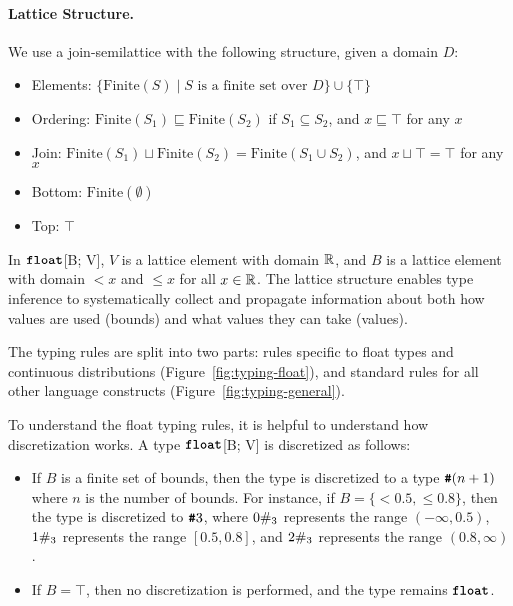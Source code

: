 \paragraph{Lattice Structure.} 
We use a join-semilattice with the following structure, given a domain $D$:
\begin{itemize}
    \item Elements: $\{\text{Finite}(S) \mid S \text{ is a finite set over } D\} \cup \{\top\}$
    \item Ordering: $\text{Finite}(S_1) \sqsubseteq \text{Finite}(S_2)$ if $S_1 \subseteq S_2$, and $x \sqsubseteq \top$ for any $x$
    \item Join: $\text{Finite}(S_1) \sqcup \text{Finite}(S_2) = \text{Finite}(S_1 \cup S_2)$, and $x \sqcup \top = \top$ for any $x$
    \item Bottom: $\text{Finite}(\emptyset)$
    \item Top: $\top$
\end{itemize}

In $\text{\ttfamily\bfseries float}$[B; V], $V$ is a lattice element with domain $\mathbb{R}$, and $B$ is a lattice element with domain $<\!\!x$ and $\leq\!\!x$ for all $x \in \mathbb{R}$.
The lattice structure enables type inference to systematically collect and propagate information about both how values are used (bounds) and what values they can take (values).



The typing rules are split into two parts: rules specific to float types and continuous distributions (Figure~\ref{fig:typing-float}), and standard rules for all other language constructs (Figure~\ref{fig:typing-general}).

To understand the float typing rules, it is helpful to understand how discretization works.
A type $\text{\ttfamily\bfseries float}$[B; V] is discretized as follows:
\begin{itemize}
    \item If $B$ is a finite set of bounds, then the type is discretized to a type $\text{\ttfamily\bfseries \#}(n+1)$ where $n$ is the number of bounds. For instance, if $B = \{<\!\!0.5, \leq\!\!0.8\}$, then the type is discretized to $\text{\ttfamily\bfseries \#}3$, where $0\#_{3}$ represents the range $(-\infty, 0.5)$, $1\#_{3}$ represents the range $[0.5, 0.8]$, and $2\#_{3}$ represents the range $(0.8, \infty)$.
    \item If $B = \top$, then no discretization is performed, and the type remains $\text{\ttfamily\bfseries float}$.
\end{itemize}


